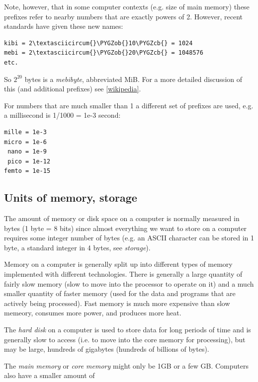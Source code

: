 \documentclass[letterpaper,10pt,english]{sphinxmanual}
\def\PYGZob{\char`\{}
\def\PYGZcb{\char`\}}
\begin{document}
Note, however, that in some computer contexts (e.g. size of main memory)
these prefixes refer to nearby numbers that are exactly powers of 2.
However, recent standards have given these new names:

\begin{Verbatim}[commandchars=\\\{\}]
kibi = 2\textasciicircum{}\PYGZob{}10\PYGZcb{} = 1024
mebi = 2\textasciicircum{}\PYGZob{}20\PYGZcb{} = 1048576
etc.
\end{Verbatim}

So $2^{20}$ bytes is a \emph{mebibyte}, abbreviated MiB.
For a more detailed discussion of this (and additional prefixes)
see \href{http://en.wikipedia.org/wiki/Binary\_prefix}{{[}wikipedia{]}}.

For numbers that are much smaller than 1 a different set of prefixes are
used, e.g. a millisecond is 1/1000 = 1e-3 second:

\begin{Verbatim}[commandchars=\\\{\}]
mille = 1e-3
micro = 1e-6
 nano = 1e-9
 pico = 1e-12
femto = 1e-15
\end{Verbatim}


\subsection{Units of memory, storage}
\label{metrics:units-of-memory-storage}
The amount of memory or disk space on a computer is normally measured in
bytes (1 byte = 8 bits) since almost everything we want to store on a
computer requires some integer number of bytes (e.g. an ASCII character can
be stored in 1 byte, a standard integer in 4 bytes, see \emph{storage}).

Memory on a computer is generally split up into different types of memory
implemented with different technologies.  There is generally a large quantity
of fairly slow memory (slow to move into the processor to operate on it) and
a much smaller quantity of faster memory (used for the data and programs
that are actively being processed).  Fast memory is much more expensive than
slow memeory, consumes more power, and produces more heat.

The \emph{hard disk} on a computer is used to store data for long periods of
time and is generally slow to access (i.e. to move into the core memory for
processing), but may be large, hundreds of gigabytes (hundreds of
billions of bytes).

The \emph{main memory} or \emph{core memory} might only be 1GB or a few GB.
Computers also have a smaller amount of
\end{document}
